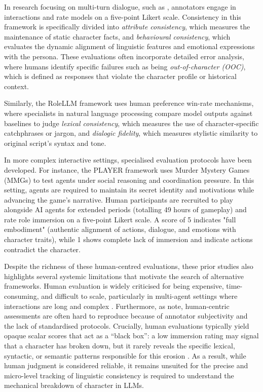 \documentclass{article}
\begin{document}
In research focusing on multi-turn dialogue, such as \citet{zhou2023characterglm}, annotators engage in interactions and rate models on a five-point Likert scale. Consistency in this framework is specifically divided into \textit{attribute consistency}, which measures the maintenance of static character facts, and \textit{behavioural consistency}, which evaluates the dynamic alignment of linguistic features and emotional expressions with the persona. These evaluations often incorporate detailed error analysis, where humans identify specific failures such as being \textit{out-of-character (OOC)}, which is defined as responses that violate the character profile or historical context.

Similarly, the RoleLLM framework \citep{wang2024rolellm} uses human preference win-rate mechanisms, where specialists in natural language processing compare model outputs against baselines to judge \textit{lexical consistency}, which measures the use of character-specific catchphrases or jargon, and \textit{dialogic fidelity}, which measures stylistic similarity to original script's syntax and tone.

In more complex interactive settings, specialised evaluation protocols have been developed. For instance, the PLAYER framework \citep{zhu2024player} uses Murder Mystery Games (MMGs) to test agents under social reasoning and coordination pressure. In this setting, agents are required to maintain its secret identity and motivations while advancing the game's narrative. Human participants are recruited to play alongside AI agents for extended periods (totalling 49 hours of gameplay) and rate role immersion on a five-point Likert scale. A score of 5 indicates "full embodiment" (authentic alignment of actions, dialogue, and emotions with character traits), while 1 shows complete lack of immersion and indicate actions contradict the character.

Despite the richness of these human-centred evaluations, these prior studies also highlights several systemic limitations that motivate the search of alternative frameworks. Human evaluation is widely criticised for being expensive, time-consuming, and difficult to scale, particularly in multi-agent settings where interactions are long and complex \citep{shao2023characterllm, chen2024review, zhu2024player}. Furthermore, as \citep{wang2024character100} note, human-centric assessments are often hard to reproduce because of annotator subjectivity and the lack of standardised protocols. Crucially, human evaluations typically yield opaque scalar scores that act as a “black box”: a low immersion rating may signal that a character has broken down, but it rarely reveals the specific lexical, syntactic, or semantic patterns responsible for this erosion \citep{bao2026eval4sim}. As a result, while human judgment is considered reliable, it remains unsuited for the precise and micro-level tracking of linguistic consistency is required to understand the mechanical breakdown of character in LLMs.
\end{document}
